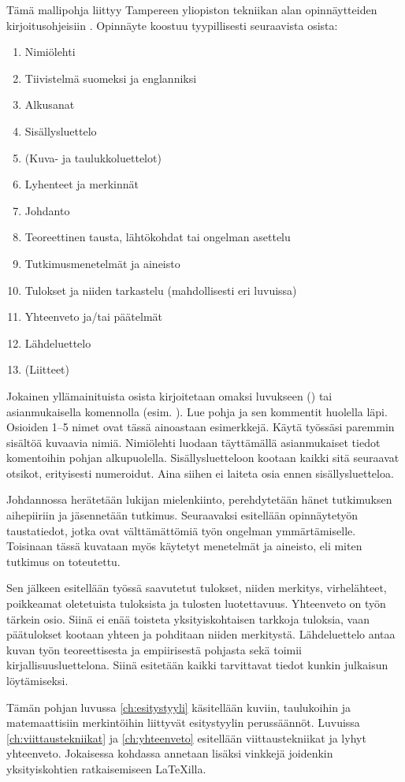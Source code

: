 Tämä mallipohja liittyy Tampereen yliopiston tekniikan alan opinnäytteiden kirjoitusohjeisiin \parencite{kirjoitusohje2018}. Opinnäyte koostuu tyypillisesti seuraavista osista:

\begin{enumerate}
    \item[] Nimiölehti
    \item[] Tiivistelmä suomeksi ja englanniksi
    \item[] Alkusanat
    \item[] Sisällysluettelo
    \item[] (Kuva- ja taulukkoluettelot)
    \item[] Lyhenteet ja merkinnät
    \item Johdanto
    \item Teoreettinen tausta, lähtökohdat tai ongelman asettelu
    \item Tutkimusmenetelmät ja aineisto
    \item Tulokset ja niiden tarkastelu (mahdollisesti eri luvuissa)
    \item Yhteenveto ja/tai päätelmät
    \item[] Lähdeluettelo
    \item[] (Liitteet)
\end{enumerate}

Jokainen yllämainituista osista kirjoitetaan omaksi luvukseen () tai asianmukaisella komennolla (esim. ). Lue pohja ja sen kommentit huolella läpi. Osioiden 1--5 nimet ovat tässä ainoastaan esimerkkejä. Käytä työssäsi paremmin sisältöä kuvaavia nimiä. Nimiölehti luodaan täyttämällä asianmukaiset tiedot komentoihin pohjan alkupuolella. Sisällysluetteloon kootaan kaikki sitä seuraavat otsikot, erityisesti numeroidut. Aina siihen ei laiteta osia ennen sisällysluetteloa.

Johdannossa herätetään lukijan mielenkiinto, perehdytetään hänet tutkimuksen aihepiiriin ja jäsennetään tutkimus. Seuraavaksi esitellään opinnäytetyön taustatiedot, jotka ovat välttämättömiä työn ongelman ymmärtämiselle. Toisinaan tässä kuvataan myös käytetyt menetelmät ja aineisto, eli miten tutkimus on toteutettu.

Sen jälkeen esitellään työssä saavutetut tulokset, niiden merkitys, virhelähteet, poikkeamat oletetuista tuloksista ja tulosten luotettavuus. Yhteenveto on työn tärkein osio. Siinä ei enää toisteta yksityiskohtaisen tarkkoja tuloksia, vaan päätulokset kootaan yhteen ja pohditaan niiden merkitystä. Lähdeluettelo antaa kuvan työn teoreettisesta ja empiirisestä pohjasta sekä toimii kirjallisuusluettelona. Siinä esitetään kaikki tarvittavat tiedot kunkin julkaisun löytämiseksi.

Tämän pohjan luvussa \ref{ch:esitystyyli} käsitellään kuviin, taulukoihin ja matemaattisiin merkintöihin liittyvät esitystyylin perussäännöt. Luvuissa \ref{ch:viittaustekniikat} ja \ref{ch:yhteenveto} esitellään viittaustekniikat ja lyhyt yhteenveto. Jokaisessa kohdassa annetaan lisäksi vinkkejä joidenkin yksityiskohtien ratkaisemiseen \LaTeX{}illa.